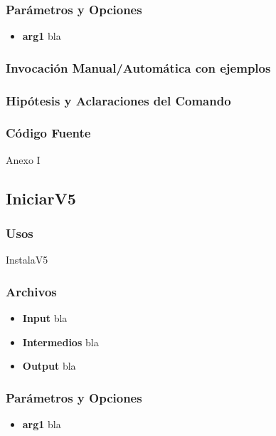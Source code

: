 \documentclass[a4paper,10pt,titlepage]{article}
\begin{document}
		\subsubsection{Par\'ametros y Opciones}
			\begin {itemize}
				\item \textbf{arg1} {bla}
			\end{itemize}
	
		\subsubsection{Invocaci\'on Manual/Autom\'atica con ejemplos}

		\subsubsection{Hip\'otesis y Aclaraciones del Comando}

		\subsubsection{C\'odigo Fuente}
			Anexo I


	\subsection{IniciarV5}
		\subsubsection{Usos}
			 InstalaV5

		\subsubsection{Archivos}
			\begin {itemize}
				\item \textbf{Input} {bla}
				\item \textbf{Intermedios} {bla}
				\item \textbf{Output} {bla}
			\end{itemize}

		\subsubsection{Par\'ametros y Opciones}
			\begin {itemize}
				\item \textbf{arg1} {bla}
			\end{itemize}
	
\end{document}
